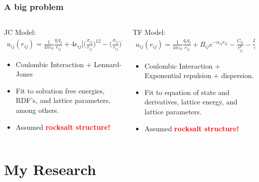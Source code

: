 \documentclass{beamer}
\newcommand{\insertcurrentcitation}{}
\newcommand{\currentcitation}[1]{
	\renewcommand{\insertcurrentcitation}{#1}
} %
\newcommand{\bb}[1]{\textcolor{red}{\textbf{#1}}}
\begin{document}
\begin{frame}
\frametitle{A big problem}
\begin{columns}
	\begin{column}{0.52\textwidth}
		JC Model:
		{\scriptsize
		\begin{align}
			u_{ij} (r_{ij}) = \frac{1}{4 \pi \varepsilon_{0}}\frac{q_{i} q_{j} }{r_{ij}} + 4 \epsilon_{ij} \bigg[ \big(\frac{\sigma_{ij}}{r_{ij}} \big)^{12} - \big(\frac{\sigma_{ij}}{r_{ij}} \big)^{6} \bigg]
		\end{align}}
		\begin{itemize}
			\item Coulombic Interaction + Lennard-Jones
			\item Fit to solvation free energies, RDF's, and lattice parameters, among others.
			\item Assumed \bb{rocksalt structure!}
		\end{itemize}
	\end{column}
\pause
	\begin{column}{0.52\textwidth}
		TF Model:
		{\scriptsize
		\begin{align}
		u_{ij} (r_{ij}) = \frac{1}{4 \pi \varepsilon_{0}}\frac{q_{i} q_{j} }{r_{ij}} + B_{ij} e^{-\alpha_{ij}r_{ij}}- \frac{C_{ij}}{r_{ij}^{6}} - \frac{D_{ij}}{r_{ij}^{8}}
		\end{align}}
		\begin{itemize}
			\item Coulombic Interaction + Exponential repulsion + dispersion.
			\item Fit to equation of state and derivatives, lattice energy, and lattice parameters.
			\item Assumed \bb{rocksalt structure!}
		\end{itemize}
	\end{column}
\end{columns}
\end{frame}

\currentcitation{}

\section{My Research}
\end{document}
